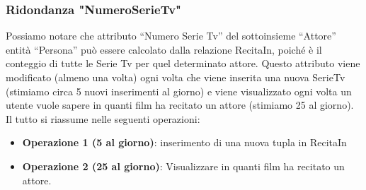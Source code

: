 \documentclass[12pt,a4paper]{article}
\begin{document}
\subsubsection{Ridondanza "NumeroSerieTv"}
Possiamo notare che attributo “Numero Serie Tv” del sottoinsieme “Attore” entità “Persona” può essere calcolato dalla relazione RecitaIn, poiché è il conteggio di tutte le Serie Tv per quel determinato attore.
Questo attributo viene modificato (almeno una volta) ogni volta che viene inserita una nuova SerieTv (stimiamo circa 5 nuovi inserimenti al giorno)
e viene visualizzato ogni volta un utente vuole sapere in quanti film ha recitato un attore (stimiamo 25 al giorno).
Il tutto si riassume nelle seguenti operazioni:
\begin{itemize}
    \item \textbf{Operazione 1 (5 al giorno)}: inserimento di una nuova tupla in RecitaIn
    \item \textbf{Operazione 2 (25 al giorno)}: Visualizzare in quanti film ha recitato un attore.
\end{itemize}
\end{document}
